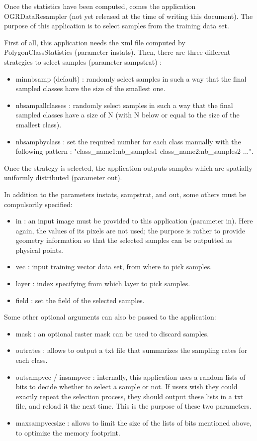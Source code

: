 Once the statistics have been computed, comes the application OGRDataResampler (not yet released at the time of writing this document).
The purpose of this application is to select samples from the training data set.

First of all, this application needs the xml file computed by PolygonClassStatistics (parameter instats).
Then, there are three different strategies to select samples (parameter sampstrat) :
\begin{itemize}
\item minnbsamp (default) : randomly select samples in such a way that the final sampled classes have the size of the smallest one.
\item nbsampallclasses : randomly select samples in such a way that the final sampled classes have a size of N (with N below or equal to the size of the smallest class).
\item nbsampbyclass : set the required number for each class manually with the following pattern : "class\_name1:nb\_samples1 class\_name2:nb\_samples2 ...".
\end{itemize}
Once the strategy is selected, the application outputs samples which are spatially uniformly distributed (parameter out).

In addition to the parameters instats, sampstrat, and out, some others must be compulsorily specified:
\begin{itemize}
\item in : an input image must be provided to this application (parameter in). Here again, the values of its pixels are not used;
the purpose is rather to provide geometry information so that the selected samples can be outputted as physical points.
\item vec : input training vector data set, from where to pick samples.
\item layer : index specifying from which layer to pick samples.
\item field : set the field of the selected samples.
\end{itemize}

Some other optional arguments can also be passed to the application:
\begin{itemize}
\item mask : an optional raster mask can be used to discard samples.
\item outrates : allows to output a txt file that summarizes the sampling rates for each class.
\item outsampvec / insampvec : internally, this application uses a random lists of bits to decide
    whether to select a sample or not. If users wish they could exactly repeat the selection process,
    they should output these lists in a txt file, and reload it the next time. This is the purpose of these two parameters.
\item maxsampvecsize : allows to limit the size of the lists of bits mentioned above, to optimize the memory footprint.
\end{itemize}


